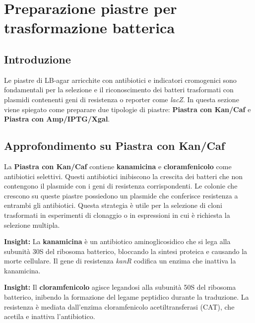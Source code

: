 \section {Preparazione piastre per trasformazione batterica}

\subsection{Introduzione}
Le piastre di LB-agar arricchite con antibiotici e indicatori cromogenici sono fondamentali per la selezione e il riconoscimento dei batteri trasformati con plasmidi contenenti geni di resistenza o reporter come \textit{lacZ}. In questa sezione viene spiegato come preparare due tipologie di piastre: \textbf{Piastra con Kan/Caf} e \textbf{Piastra con Amp/IPTG/Xgal}.

\subsection{Approfondimento su Piastra con Kan/Caf}
La \textbf{Piastra con Kan/Caf} contiene \textbf{kanamicina} e \textbf{cloramfenicolo} come antibiotici selettivi. Questi antibiotici inibiscono la crescita dei batteri che non contengono il plasmide con i geni di resistenza corrispondenti. Le colonie che crescono su queste piastre possiedono un plasmide che conferisce resistenza a entrambi gli antibiotici. Questa strategia è utile per la selezione di cloni trasformati in esperimenti di clonaggio o in espressioni in cui è richiesta la selezione multipla.


\begin{insightBox}
  \textbf{Insight:} La \textbf{kanamicina} è un antibiotico aminoglicosidico che si lega alla subunità 30S del ribosoma batterico, bloccando la sintesi proteica e causando la morte cellulare. Il gene di resistenza \textit{kanR} codifica un enzima che inattiva la kanamicina.
\end{insightBox}

\begin{insightBox}
  \textbf{Insight:} Il \textbf{cloramfenicolo} agisce legandosi alla subunità 50S del ribosoma batterico, inibendo la formazione del legame peptidico durante la traduzione. La resistenza è mediata dall’enzima cloramfenicolo acetiltransferasi (CAT), che acetila e inattiva l’antibiotico.
\end{insightBox}

